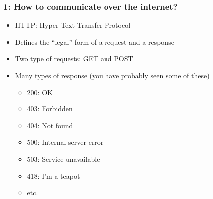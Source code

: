 \documentclass{beamer}
\begin{document}
\begin{frame}
  \frametitle{1: How to communicate over the internet?}

  \begin{itemize}
  \item HTTP: Hyper-Text Transfer Protocol
  \item Defines the ``legal'' form of a request and a response
  \item Two type of requests: GET and POST
  \item Many types of response (you have probably seen some of these)
    \begin{itemize}
    \item 200: OK
    \item 403: Forbidden
    \item 404: Not found
    \item 500: Internal server error
    \item 503: Service unavailable
    \item 418: I'm a teapot
    \item etc.
    \end{itemize}
  \end{itemize}
\end{frame}
\end{document}
